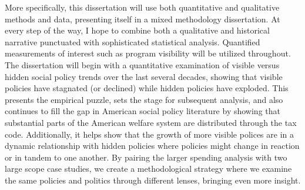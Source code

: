\documentclass[12pt]{article}
\begin{document}
More specifically, this dissertation will use both quantitative and qualitative methods and data, presenting itself in a mixed methodology dissertation. At every step of the way, I hope to combine both a qualitative and historical narrative punctuated with sophisticated statistical analysis. Quantified measurements of interest such as program visibility will be utilized throughout. The dissertation will begin with a quantitative examination of visible versus hidden social policy trends over the last several decades, showing that visible policies have stagnated (or declined) while hidden policies have exploded. This presents the empirical puzzle, sets the stage for subsequent analysis, and also continues to fill the gap in American social policy literature by showing that substantial parts of the American welfare system are distributed through the tax code. Additionally, it helps show that the growth of more visible polices are in a dynamic relationship with hidden policies where policies might change in reaction or in tandem to one another. By pairing the larger spending analysis with two large scope case studies, we create a methodological strategy where we examine the same policies and politics through different lenses, bringing even more insight.
\end{document}
